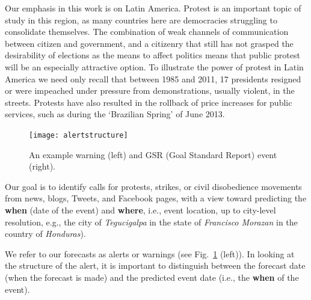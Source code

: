 Our emphasis in this work is on Latin America.
Protest is an important topic of study in this
region, as many countries here are democracies struggling to consolidate themselves.
The combination of weak channels of communication between citizen and government, and a citizenry that still 
has not grasped the desirability of elections as the means to affect politics means that public protest 
will be an especially attractive option. To illustrate the power of protest in Latin America we need 
only recall that between 1985 and 2011, 17 presidents resigned or were impeached under pressure from 
demonstrations, usually violent, in the streets. Protests have also resulted 
in the rollback of price increases for public services, such as during the `Brazilian Spring' of June 2013.
\begin{figure}
    \centering
    \texttt{[image: alertstructure]}
    \caption{An example warning (left) and GSR (Goal Standard Report) event (right).}
    \label{fig:alertstructure}
\end{figure}
Our goal is to identify calls for protests, strikes, or civil disobedience movements from news, blogs, Tweets, and Facebook
pages, with a view toward predicting the {\bf when} (date of the event) and {\bf where}, i.e.,
event location, up to city-level resolution, e.g., 
the city of {\it Tegucigalpa} in the state of {\it Francisco Morazan} in the country of {\it Honduras}).

We refer to our forecasts as alerts or warnings (see Fig.~\ref{fig:alertstructure} (left)).
In looking at the structure of the alert, it is important to distinguish between the forecast date (when the forecast is made)
and the predicted event date (i.e., the {\bf when} of the event).


